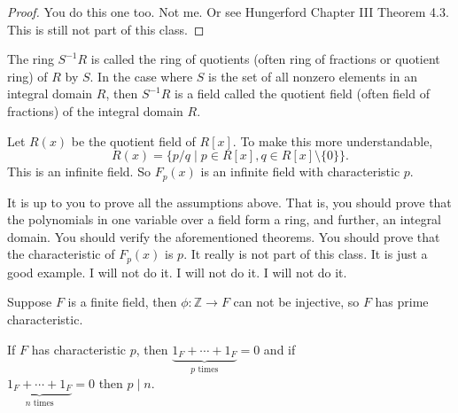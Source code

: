\begin{eg}
\begin{theorem}[{[Hungerford]}]
\begin{itemize}
		\end{itemize}
	\end{theorem}
	\begin{proof}
		You do this one too. Not me. Or see Hungerford Chapter III Theorem 4.3. This is still not part of this class.
	\end{proof}
	\begin{definition}
		The ring \(S^{-1} R\) is called the ring of quotients (often ring of fractions or quotient ring) of \(R\) by \(S\). In the case where \(S\) is the set of all nonzero elements in an integral domain \(R\), then \(S^{-1} R\) is a field called the quotient field (often field of fractions) of the integral domain \(R\).
	\end{definition}
	Let \(R(x)\) be the quotient field of \(R[x]\). To make this more understandable,
	\[
		R(x) = \{ p/q \mid p \in R[x], q \in R[x]\setminus \{ 0 \}  \}.
	\]
	This is an infinite field. So \(F_p(x)\) is an infinite field with characteristic \(p\).   
\end{eg}
\begin{explanation}
	It is up to you to prove all the assumptions above. That is, you should prove that the polynomials in one variable over a field form a ring, and further, an integral domain. You should verify the aforementioned theorems. You should prove that the characteristic of \(F_p(x)\) is \(p\). It really is not part of this class. It is just a good example. I will not do it. I will not do it. I will not do it.
\end{explanation}
\begin{lemma}
	Suppose \(F\) is a finite field, then \(\phi \colon \mathbb{Z} \to F\) can not be injective, so \(F\) has prime characteristic.
\end{lemma}
\begin{lemma}
	If \(F\) has characteristic \(p\), then \(\underbrace{1_F + \cdots + 1_F}_{p \text{ times} } = 0\) and if \\ \(\underbrace{1_F + \cdots + 1_F}_{n \text{ times} } = 0\) then \(p\mid n\).
\end{lemma}

